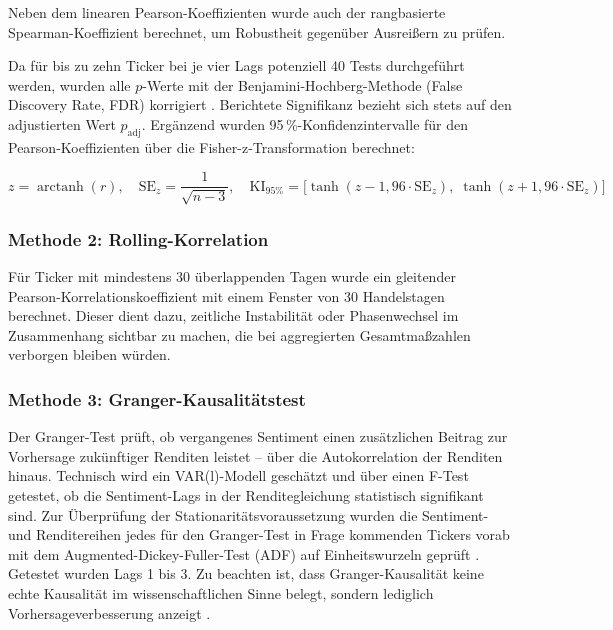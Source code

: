 Neben dem linearen Pearson-Koeffizienten wurde auch der rangbasierte Spearman-Koeffizient berechnet, um Robustheit gegenüber Ausreißern zu prüfen.

Da für bis zu zehn Ticker bei je vier Lags potenziell 40 Tests durchgeführt werden, wurden alle $p$-Werte mit der Benjamini-Hochberg-Methode (False Discovery Rate, FDR) korrigiert \autocite{benjamini1995controlling}. Berichtete Signifikanz bezieht sich stets auf den adjustierten Wert $p_{\mathrm{adj}}$. Ergänzend wurden 95\,\%-Konfidenzintervalle für den Pearson-Koeffizienten über die Fisher-z-Transformation berechnet:

\begin{equation}
z = \operatorname{arctanh}(r), \quad
\mathrm{SE}_z = \frac{1}{\sqrt{n-3}}, \quad
\mathrm{KI}_{95\%} = \bigl[\tanh(z - 1{,}96 \cdot \mathrm{SE}_z),\; \tanh(z + 1{,}96 \cdot \mathrm{SE}_z)\bigr]
\label{eq:fisher_ci}
\end{equation}

\subsubsection*{Methode 2: Rolling-Korrelation}

Für Ticker mit mindestens 30 überlappenden Tagen wurde ein gleitender Pearson-Korrelationskoeffizient mit einem Fenster von 30 Handelstagen berechnet. Dieser dient dazu, zeitliche Instabilität oder Phasenwechsel im Zusammenhang sichtbar zu machen, die bei aggregierten Gesamtmaßzahlen verborgen bleiben würden.

\subsubsection*{Methode 3: Granger-Kausalitätstest}

Der Granger-Test \autocite{granger1969investigating} prüft, ob vergangenes Sentiment einen zusätzlichen Beitrag zur Vorhersage zukünftiger Renditen leistet -- über die Autokorrelation der Renditen hinaus. Technisch wird ein VAR(l)-Modell geschätzt und über einen F-Test getestet, ob die Sentiment-Lags in der Renditegleichung statistisch signifikant sind. Zur Überprüfung der Stationaritätsvoraussetzung wurden die Sentiment- und Renditereihen jedes für den Granger-Test in Frage kommenden Tickers vorab mit dem Augmented-Dickey-Fuller-Test (ADF) auf Einheitswurzeln geprüft \autocite{dickey1979distribution}. Getestet wurden Lags 1 bis 3. Zu beachten ist, dass Granger-Kausalität keine echte Kausalität im wissenschaftlichen Sinne belegt, sondern lediglich Vorhersageverbesserung anzeigt \autocite{granger1969investigating}.

